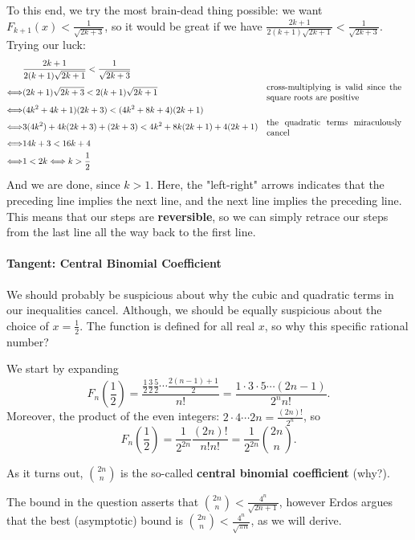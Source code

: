 \documentclass[../main.tex]{subfiles}
\begin{document}
To this end, we try the most brain-dead thing possible: we want $F_{k+1}(x) < \frac{1}{\sqrt{2k+3}}$, so it would be great if we have $\frac{2k+1}{2(k+1)\sqrt{2k+1}}<\frac{1}{\sqrt{2k+3}}$. Trying our luck:
\begin{align*}
    &\frac{2k+1}{2(k+1)\sqrt{2k+1}} < \frac{1}{\sqrt{2k+3}} \\
    \Longleftrightarrow& (2k+1)\sqrt{2k+3} < 2(k+1)\sqrt{2k+1} && \parbox{5.5cm}{cross-multiplying is valid since the square roots are positive}\\
    \Longleftrightarrow& (4k^2+4k+1)(2k+3) < (4k^2+8k+4)(2k+1) && \\
    \Longleftrightarrow& 3(4k^2)+4k(2k+3)+(2k+3) < 4k^2+8k(2k+1)+4(2k+1) &&\parbox{5.5cm}{the quadratic terms miraculously cancel}\\
    \Longleftrightarrow& 14k+3 < 16k+4 \\
    \Longleftrightarrow& 1 < 2k \Longleftrightarrow k > \frac{1}{2}
\end{align*}
And we are done, since $k > 1$. Here, the "left-right" arrows indicates that the preceding line implies the next line, and the next line implies the preceding line. This means that our steps are \textbf{reversible}, so we can simply retrace our steps from the last line all the way back to the first line.

\paragraph{Tangent: Central Binomial Coefficient}\label{algebra-cbc}
We should probably be suspicious about why the cubic and quadratic terms in our inequalities cancel. Although, we should be equally suspicious about the choice of $x=\frac{1}{2}$. The function is defined for all real $x$, so why this specific rational number?

We start by expanding $$F_n\left(\frac{1}{2}\right)=\frac{\frac{1}{2}\frac{3}{2}\frac{5}{2}\cdots\frac{2(n-1)+1}{2}}{n!}=\frac{1\cdot3\cdot5\cdots(2n-1)}{2^nn!}.$$
Moreover, the product of the even integers: $2\cdot4\cdots2n=\frac{(2n)!}{2^n}$, so $$F_n\left(\frac{1}{2}\right)=\frac{1}{2^{2n}}\frac{(2n)!}{n!n!}=\frac{1}{2^{2n}}\binom{2n}{n}.$$

As it turns out, $\binom{2n}{n}$ is the so-called \textbf{central binomial coefficient} (why?).

The bound in the question asserts that $\binom{2n}{n} < \frac{4^n}{\sqrt{2n+1}}$, however Erdos argues that the best (asymptotic) bound is $\binom{2n}{n} < \frac{4^n}{\sqrt{\pi n}}$, as we will derive.
\end{document}

